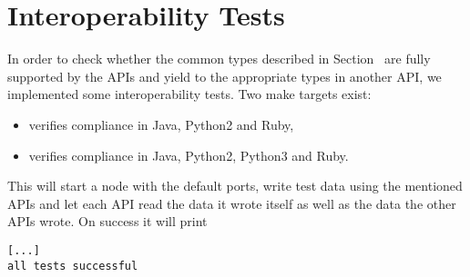 \section{Interoperability Tests}
In order to check whether the common types described in
Section~ are fully supported by the APIs
and yield to the appropriate types in another API, we implemented some
interoperability tests. Two make targets exist:
\begin{itemize}
  \item {} verifies compliance in Java, Python2 and Ruby,
  \item {} verifies compliance in Java, Python2, Python3 and Ruby.
\end{itemize}
This will start a \scalaris{} node with the default ports, write test data using
the mentioned APIs and let each API read the data it wrote
itself as well as the data the other APIs wrote. On success it will print

\begin{lstlisting}[language={}]
%> make interop3-test
[...]
all tests successful
\end{lstlisting}
